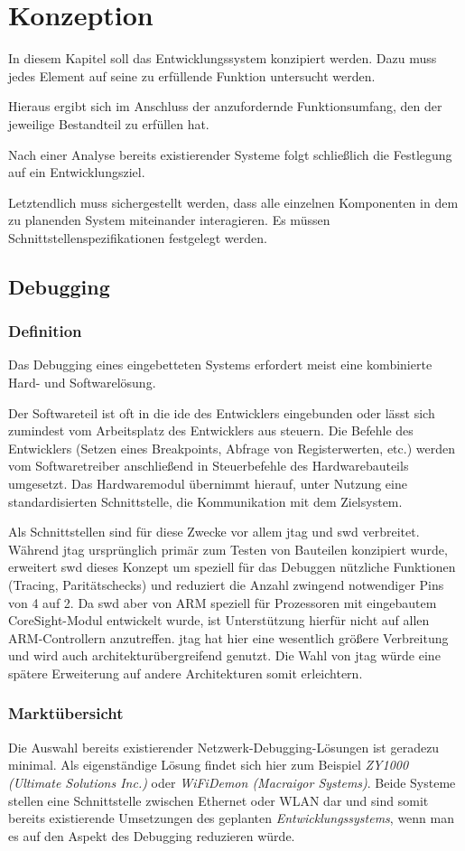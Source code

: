\chapter{Konzeption}
\minitoc
In diesem Kapitel soll das Entwicklungssystem konzipiert werden.
Dazu muss jedes Element auf seine zu erfüllende Funktion untersucht werden.

Hieraus ergibt sich im Anschluss der anzufordernde Funktionsumfang, den der
jeweilige Bestandteil zu erfüllen hat.

Nach einer Analyse bereits existierender Systeme folgt schließlich die
Festlegung auf ein Entwicklungsziel.

Letztendlich muss sichergestellt werden, dass alle einzelnen Komponenten in dem
zu planenden System miteinander interagieren. Es müssen
Schnittstellenspezifikationen festgelegt werden.
\section{Debugging}
\subsection{Definition}
Das Debugging eines eingebetteten Systems erfordert meist eine kombinierte Hard-
und Softwarelösung.

Der Softwareteil ist oft in die \gls{ide} des Entwicklers eingebunden oder lässt
sich zumindest vom Arbeitsplatz des Entwicklers aus steuern. Die Befehle des
Entwicklers (Setzen eines Breakpoints, Abfrage von Registerwerten, etc.) werden
vom Softwaretreiber anschließend in Steuerbefehle des Hardwarebauteils
umgesetzt. Das Hardwaremodul übernimmt hierauf, unter Nutzung eine
standardisierten Schnittstelle, die Kommunikation mit dem Zielsystem.

Als Schnittstellen sind für diese Zwecke vor allem \gls{jtag} und \gls{swd}
verbreitet. Während \gls{jtag} ursprünglich primär zum Testen von Bauteilen
konzipiert wurde, erweitert \gls{swd} dieses Konzept um speziell für das
Debuggen nützliche Funktionen (Tracing, Paritätschecks) und reduziert die Anzahl
zwingend notwendiger Pins von 4 auf 2. Da \gls{swd} aber von
ARM speziell für Prozessoren mit eingebautem CoreSight-Modul entwickelt wurde,
ist Unterstützung hierfür nicht auf allen ARM-Controllern anzutreffen. \gls{jtag}
hat hier eine wesentlich größere Verbreitung und wird auch
architekturübergreifend genutzt. Die Wahl von \gls{jtag} würde eine spätere
Erweiterung auf andere Architekturen somit erleichtern.
\subsection{Marktübersicht}
Die Auswahl bereits existierender Netzwerk-Debugging-Lösungen ist geradezu
minimal.
Als eigenständige Lösung findet sich hier zum Beispiel \emph{ZY1000 (Ultimate
Solutions Inc.)}\cite{ULT} oder \emph{WiFiDemon (Macraigor Systems)}\cite{MAC}.
Beide Systeme stellen eine Schnittstelle zwischen Ethernet oder WLAN dar und sind somit
bereits existierende Umsetzungen des geplanten \emph{Entwicklungssystems}, wenn
man es auf den Aspekt des Debugging reduzieren würde.

